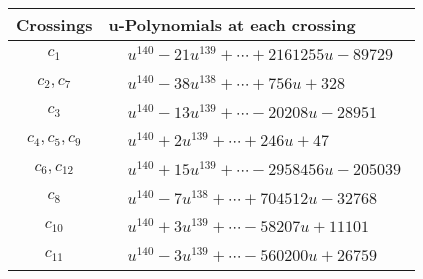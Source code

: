 \documentclass[1p]{elsarticle_modified}
\theoremstyle{definition}
\begin{document}
\begin{tabular}{m{50pt}|m{274pt}}
Crossings & \hspace{64pt}u-Polynomials at each crossing \\
\hline $$\begin{aligned}c_{1}\end{aligned}$$&$\begin{aligned}
&u^{140}-21 u^{139}+\cdots+2161255 u-89729
\end{aligned}$\\
\hline $$\begin{aligned}c_{2},c_{7}\end{aligned}$$&$\begin{aligned}
&u^{140}-38 u^{138}+\cdots+756 u+328
\end{aligned}$\\
\hline $$\begin{aligned}c_{3}\end{aligned}$$&$\begin{aligned}
&u^{140}-13 u^{139}+\cdots-20208 u-28951
\end{aligned}$\\
\hline $$\begin{aligned}c_{4},c_{5},c_{9}\end{aligned}$$&$\begin{aligned}
&u^{140}+2 u^{139}+\cdots+246 u+47
\end{aligned}$\\
\hline $$\begin{aligned}c_{6},c_{12}\end{aligned}$$&$\begin{aligned}
&u^{140}+15 u^{139}+\cdots-2958456 u-205039
\end{aligned}$\\
\hline $$\begin{aligned}c_{8}\end{aligned}$$&$\begin{aligned}
&u^{140}-7 u^{138}+\cdots+704512 u-32768
\end{aligned}$\\
\hline $$\begin{aligned}c_{10}\end{aligned}$$&$\begin{aligned}
&u^{140}+3 u^{139}+\cdots-58207 u+11101
\end{aligned}$\\
\hline $$\begin{aligned}c_{11}\end{aligned}$$&$\begin{aligned}
&u^{140}-3 u^{139}+\cdots-560200 u+26759
\end{aligned}$\\
\hline
\end{tabular}\\~\\
\end{document}
